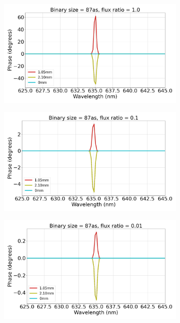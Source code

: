 \begin{figure}[ht!]
    \centering
    \begin{subfigure}{0.5\textwidth}
        \centering
        \includegraphics[width=\textwidth]{Figure_Chap4/SpectralDiffPhase_BinSize87_FR1e0_37_7_26_15_28_SpecRes3200.png}
        \caption{}
        \label{fig:PhaseDiffWaveSimuleA}
    \end{subfigure}
    \begin{subfigure}{0.5\textwidth}
        \centering
        \includegraphics[width=\textwidth]{Figure_Chap4/SpectralDiffPhase_BinSize87_FR1e-1_37_7_26_15_28_SpecRes3200.png}
        \caption{}
        \label{fig:PhaseDiffWaveSimuleB}
    \end{subfigure}%
    \begin{subfigure}{0.5\textwidth}
        \centering
        \includegraphics[width=\textwidth]{Figure_Chap4/SpectralDiffPhase_BinSize87_FR1e-2_37_7_26_15_28_SpecRes3200.png}

\end{subfigure}
\end{figure}
